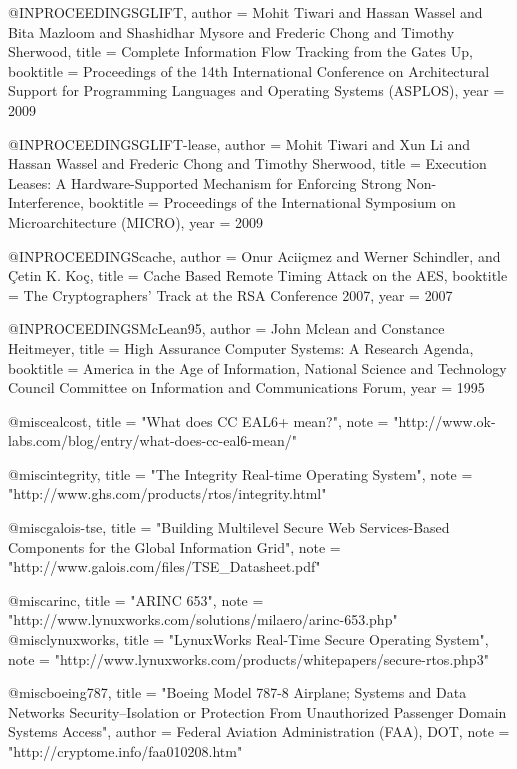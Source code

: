 @INPROCEEDINGS{GLIFT,
    author = {Mohit Tiwari and Hassan Wassel and Bita Mazloom and Shashidhar Mysore and Frederic Chong and Timothy Sherwood},
    title = {Complete Information Flow Tracking from the Gates Up},
    booktitle = {Proceedings of the 14th International Conference on Architectural Support for Programming Languages and Operating Systems  (ASPLOS)},
    year = {2009}
}

@INPROCEEDINGS{GLIFT-lease,
    author = {Mohit Tiwari and Xun Li and Hassan Wassel and Frederic Chong and Timothy Sherwood},
    title = {Execution Leases: A Hardware-Supported Mechanism for Enforcing Strong Non-Interference},
    booktitle = {Proceedings of the International Symposium on Microarchitecture (MICRO)},
    year = {2009}
}


@INPROCEEDINGS{cache,
    author = {Onur Aciiçmez and Werner Schindler, and Çetin K. Koç},
    title = {Cache Based Remote Timing Attack on the AES},
    booktitle = {The Cryptographers' Track at the RSA Conference 2007},
    year = {2007}
}

@INPROCEEDINGS{McLean95,
    author = {John Mclean and Constance Heitmeyer},
    title = {High Assurance Computer Systems: A Research Agenda},
    booktitle = {America in the Age of Information, National Science and Technology Council Committee on Information and Communications Forum},
    year = {1995}
}

@misc{ealcost,
  title = "What does CC EAL6+ mean?", 
  note = "http://www.ok-labs.com/blog/entry/what-does-cc-eal6-mean/"
}

@misc{integrity,
  title = "The Integrity Real-time Operating System", 
  note = "http://www.ghs.com/products/rtos/integrity.html"
}

@misc{galois-tse,
  title = "Building Multilevel Secure Web Services-Based Components for the Global Information Grid", 
  note = "http://www.galois.com/files/TSE\_Datasheet.pdf"
}

@misc{arinc,
  title = "ARINC 653", 
  note = "http://www.lynuxworks.com/solutions/milaero/arinc-653.php"
}
@misc{lynuxworks,
  title = "LynuxWorks Real-Time Secure Operating System", 
  note = "http://www.lynuxworks.com/products/whitepapers/secure-rtos.php3"
}



@misc{boeing787,
  title = "Boeing Model 787-8 Airplane; Systems and Data Networks Security--Isolation or Protection From Unauthorized Passenger Domain Systems Access",
  author = {Federal Aviation Administration (FAA), DOT},
  note = "http://cryptome.info/faa010208.htm"
}


